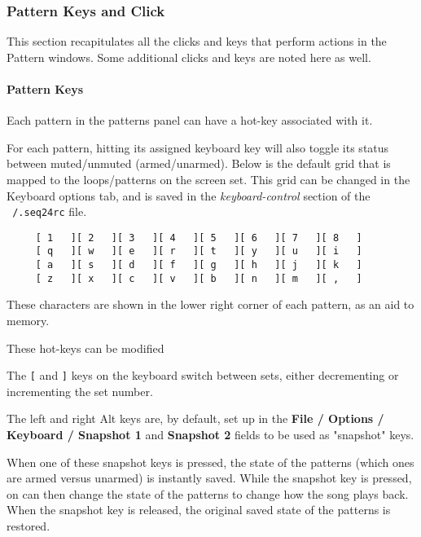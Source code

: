 \subsubsection{Pattern Keys and Click}
\label{subsubsec:seq24_patterns_pattern_keys_and_clicks}

   This section recapitulates all the clicks and keys that perform actions
   in the Pattern windows.  Some additional clicks and keys are noted here
   as well.

\paragraph{Pattern Keys}
\label{paragraph:seq24_patterns_pattern_keys}

   Each pattern in the patterns panel can have a hot-key associated with it.

   For each pattern, hitting its assigned keyboard key will
   also toggle its status between muted/unmuted (armed/unarmed).
   Below is the default grid that is
   mapped to the loops/patterns on the screen set.
   This grid can be changed in the Keyboard options tab, and is
   saved in the \textsl{keyboard-control} section of the
   \texttt{~/.seq24rc} file.

   \begin{verbatim}
     [ 1   ][ 2   ][ 3   ][ 4   ][ 5   ][ 6   ][ 7   ][ 8   ]
     [ q   ][ w   ][ e   ][ r   ][ t   ][ y   ][ u   ][ i   ]
     [ a   ][ s   ][ d   ][ f   ][ g   ][ h   ][ j   ][ k   ]
     [ z   ][ x   ][ c   ][ v   ][ b   ][ n   ][ m   ][ ,   ]
   \end{verbatim}

   These characters are shown in the lower right corner of each
   pattern, as an aid to memory.

   These hot-keys can be modified

   \index{keys![}
   The \texttt{[} and
   \index{keys!]}
   \texttt{]} keys on the keyboard
   switch between sets, either decrementing or incrementing the set number.

   The left and right Alt keys are, by default, set up in the
   \textbf{File / Options / Keyboard / Snapshot 1} and
   \textbf{Snapshot 2} fields to be used as "snapshot" keys.

   When one of these snapshot keys is pressed, the state of the patterns
   (which ones are armed versus unarmed) is instantly saved.  While the
   snapshot key is pressed, on can then change the state of the patterns to
   change how the song plays back.  When the snapshot key is released, the
   original saved state of the patterns is restored.

